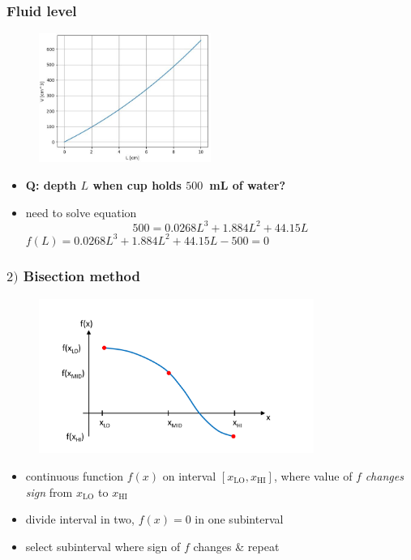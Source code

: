 \documentclass[english,14pt]{beamer}
\begin{document}
\begin{frame}[fragile]

\frametitle{Fluid level}

\vspace*{-4mm}
\begin{figure}[ht]
	\centering
	\includegraphics[width=0.5\textwidth]{figures/fluidVvsL}
\end{figure}
\vspace*{-4mm}
\begin{itemize}
	\item[] \textbf{Q: depth $L$ when cup holds $500$~mL of water?}
	\item need to solve equation
	\[
	500 = 0.0268L^3 + 1.884L^2 + 44.15L
	\]
	$f(L) = 0.0268L^3 + 1.884L^2 + 44.15L - 500 = 0$
\end{itemize}
	
\end{frame}


\begin{frame}[fragile]

\frametitle{$2)$ Bisection method}

\vspace*{-15mm}
\begin{figure}[ht]
	\centering
	\includegraphics[width=0.8\textwidth]{figures/bisection1}
\end{figure}
\vspace*{-10mm}
\begin{itemize}
\item continuous function $f(x)$ on interval $[x_\mathrm{LO},x_\mathrm{HI}]$, where value of $f$ \emph{changes sign} from $x_\mathrm{LO}$ to $x_\mathrm{HI}$
\item divide interval in two, $f(x)=0$ in one subinterval
\item select subinterval where sign of $f$ changes \& repeat
\end{itemize}

\end{frame}
\end{document}
